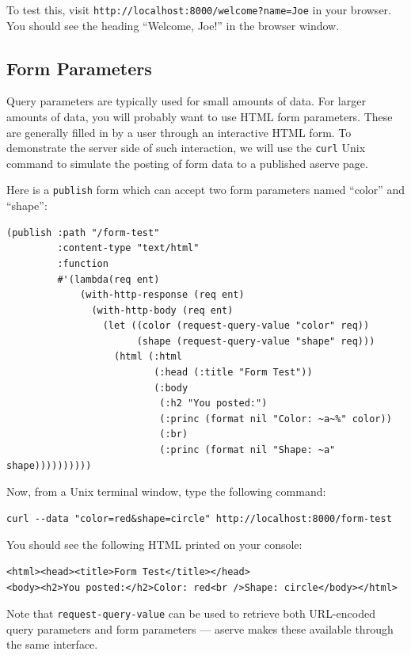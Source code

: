 To test this, visit \texttt{http://localhost:8000/welcome?name=Joe} in your browser. You should
see the heading ``Welcome, Joe!'' in the browser window.

\subsection{Form Parameters}

Query parameters are typically used for small amounts of data. For larger amounts of data,
you will probably want to use HTML form parameters. These are generally filled in by a
user through an interactive HTML form. To demonstrate the server side of such interaction,
we will use the \texttt{curl} Unix command to simulate the posting of form data to a published
aserve page.

Here is a \texttt{publish} form which can accept two form parameters named ``color'' and
``shape'':

\begin{verbatim}
(publish :path "/form-test"
         :content-type "text/html"
         :function
         #'(lambda(req ent)
             (with-http-response (req ent)
               (with-http-body (req ent)
                 (let ((color (request-query-value "color" req))
                       (shape (request-query-value "shape" req)))
                   (html (:html
                          (:head (:title "Form Test"))
                          (:body
                           (:h2 "You posted:")
                           (:princ (format nil "Color: ~a~%" color))
                           (:br)
                           (:princ (format nil "Shape: ~a" shape))))))))))
\end{verbatim}

Now, from a Unix terminal window, type the following command:

\begin{verbatim}
curl --data "color=red&shape=circle" http://localhost:8000/form-test
\end{verbatim}

You should see the following HTML printed on your console:

\begin{verbatim}
<html><head><title>Form Test</title></head>
<body><h2>You posted:</h2>Color: red<br />Shape: circle</body></html>
\end{verbatim}

Note that \texttt{request-query-value} can be used to retrieve both URL-encoded query parameters and form parameters --- aserve makes these available through the same interface.

